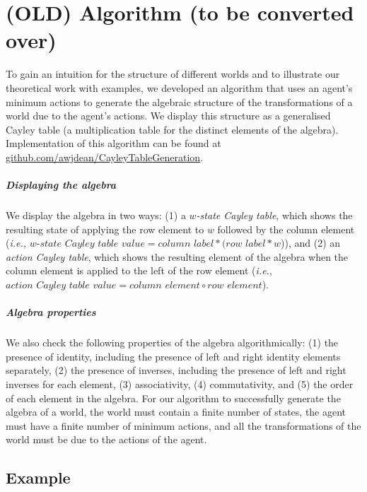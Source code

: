 \chapter{(OLD) Algorithm (to be converted over)}
To gain an intuition for the structure of different worlds and to illustrate our theoretical work with examples, we developed an algorithm that uses an agent’s minimum actions to generate the algebraic structure of the transformations of a world due to the agent's actions.
We display this structure as a generalised Cayley table (a multiplication table for the distinct elements of the algebra).
Implementation of this algorithm can be found at \url{github.com/awjdean/CayleyTableGeneration}.

\paragraph{Displaying the algebra}
We display the algebra in two ways:
(1) a \textit{$w$-state Cayley table}, which shows the resulting state of applying the row element to $w$ followed by the column element (\textit{i.e.,} $w\textit{-state Cayley table value} = \textit{column label} * (\textit{row label} * w$)), and (2) an \textit{action Cayley table}, which shows the resulting element of the algebra when the column element is applied to the left of the row element (\textit{i.e.}, $\textit{action Cayley table value} = \textit{column element} \circ \textit{row element}$).

\paragraph{Algebra properties}
We also check the following properties of the algebra algorithmically: (1) the presence of identity, including the presence of left and right identity elements separately, (2) the presence of inverses, including the presence of left and right inverses for each element, (3) associativity, (4) commutativity, and (5) the order of each element in the algebra.
For our algorithm to successfully generate the algebra of a world, the world must contain a finite number of states, the agent must have a finite number of minimum actions, and all the transformations of the world must be due to the actions of the agent.

\section{Example}\label{sec:Example}

